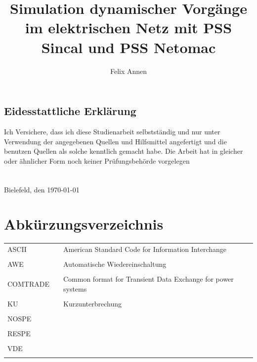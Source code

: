 \documentclass{scrartcl}
\title{Simulation dynamischer Vorgänge im elektrischen Netz mit PSS Sincal und PSS Netomac}
\author{Felix Annen}
\begin{document}
\begin{titlepage}



\maketitle
\thispagestyle{empty}
\newpage
	\subsection*{Eidesstattliche Erklärung}
	\glqq Ich Versichere, dass ich diese Studienarbeit selbstständig und nur unter Verwendung der angegebenen Quellen und Hilfsmittel angefertigt und die benutzen Quellen als solche kenntlich gemacht habe. Die Arbeit hat in gleicher oder ähnlicher Form noch keiner Prüfungsbehörde vorgelegen\grqq \\ \\ \\
	Bielefeld, den \today


\end{titlepage}


	\setcounter{page}{1}
	\tableofcontents
	\newpage
	\listoffigures
	
	\listoftables
	
	\newpage
	\section*{Abkürzungsverzeichnis}
	\begin{tabular}{lll}
	ASCII & & American Standard Code for Information Interchange \\ \\
	AWE & & Automatische Wiedereinschaltung \\ \\
	COMTRADE & & Common format for Transient Data Exchange for power systems \\ \\
	KU & & Kurzunterbrechung \\ \\
	NOSPE & & \\ \\
	RESPE & & \\ \\
	VDE & & \\ \\
	
	\end{tabular}
	
\end{document}
